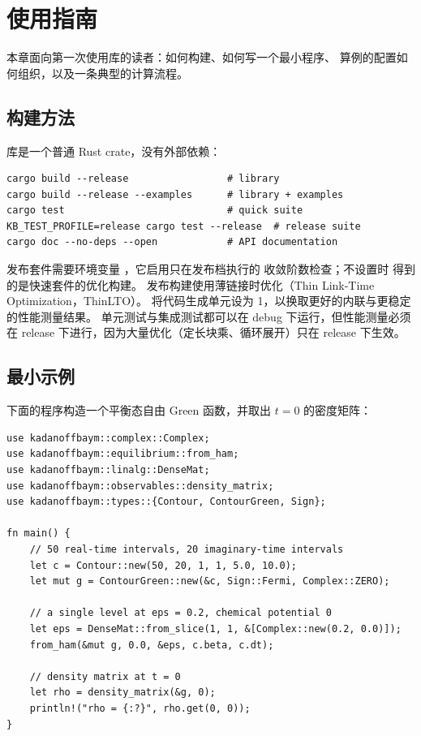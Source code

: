 \chapter{使用指南}
\label{ch:usage}

本章面向第一次使用库的读者：如何构建、如何写一个最小程序、
算例的配置如何组织，以及一条典型的计算流程。

\section{构建方法}
\label{sec:build}

库是一个普通 Rust crate，没有外部依赖：
\begin{lstlisting}[numbers=none]
cargo build --release                 # library
cargo build --release --examples      # library + examples
cargo test                            # quick suite
KB_TEST_PROFILE=release cargo test --release  # release suite
cargo doc --no-deps --open            # API documentation
\end{lstlisting}
发布套件需要环境变量 ，它启用只在发布档执行的
收敛阶数检查；不设置时  得到的是快速套件的优化构建。
发布构建使用薄链接时优化（Thin Link-Time Optimization，ThinLTO）。
 将代码生成单元设为 1，以换取更好的内联与更稳定的性能测量结果。
单元测试与集成测试都可以在 debug 下运行，但性能测量必须在 release
下进行，因为大量优化（定长块乘、循环展开）只在 release 下生效。

\section{最小示例}
\label{sec:minimal-example}

下面的程序构造一个平衡态自由 Green 函数，并取出 $t=0$ 的密度矩阵：
\begin{lstlisting}[caption={最小示例},label={lst:minimal}]
use kadanoffbaym::complex::Complex;
use kadanoffbaym::equilibrium::from_ham;
use kadanoffbaym::linalg::DenseMat;
use kadanoffbaym::observables::density_matrix;
use kadanoffbaym::types::{Contour, ContourGreen, Sign};

fn main() {
    // 50 real-time intervals, 20 imaginary-time intervals
    let c = Contour::new(50, 20, 1, 1, 5.0, 10.0);
    let mut g = ContourGreen::new(&c, Sign::Fermi, Complex::ZERO);

    // a single level at eps = 0.2, chemical potential 0
    let eps = DenseMat::from_slice(1, 1, &[Complex::new(0.2, 0.0)]);
    from_ham(&mut g, 0.0, &eps, c.beta, c.dt);

    // density matrix at t = 0
    let rho = density_matrix(&g, 0);
    println!("rho = {:?}", rho.get(0, 0));
}
\end{lstlisting}

